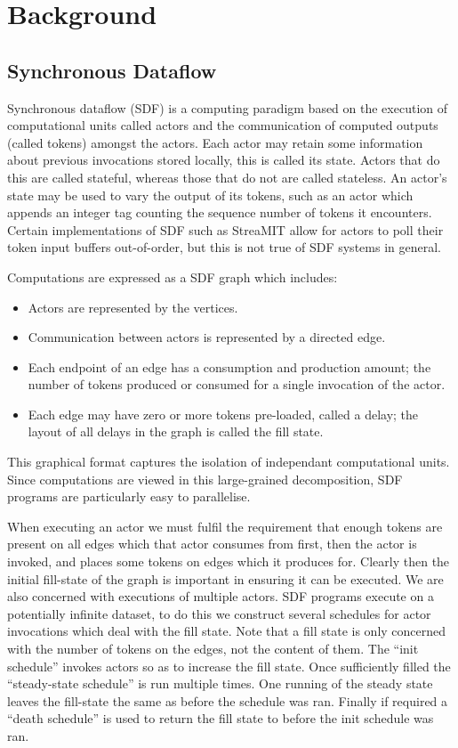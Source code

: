 \section{Background}
\subsection{Synchronous Dataflow}
Synchronous dataflow (SDF) is a computing paradigm based on the execution of computational units called actors and the communication of computed outputs (called tokens) amongst the actors.
Each actor may retain some information about previous invocations stored locally, this is called its state.
Actors that do this are called stateful, whereas those that do not are called stateless.
An actor's state may be used to vary the output of its tokens, such as an actor which appends an integer tag counting the sequence number of tokens it encounters.
Certain implementations of SDF such as StreaMIT \cite{thies02} allow for actors to poll their token input buffers out-of-order, but this is not true of SDF systems in general.

Computations are expressed as a SDF graph which includes:
\begin{itemize}
	\item Actors are represented by the vertices.
	\item Communication between actors is represented by a directed edge.
	\item Each endpoint of an edge has a consumption and production amount; the number of tokens produced or consumed for a single invocation of the actor.
	\item Each edge may have zero or more tokens pre-loaded, called a delay; the layout of all delays in the graph is called the fill state.
\end{itemize}
This graphical format captures the isolation of independant computational units.
Since computations are viewed in this large-grained decomposition, SDF programs are particularly easy to parallelise.

When executing an actor we must fulfil the requirement that enough tokens are present on all edges which that actor consumes from first, then the actor is invoked, and places some tokens on edges which it produces for.
Clearly then the initial fill-state of the graph is important in ensuring it can be executed.
We are also concerned with executions of multiple actors.
SDF programs execute on a potentially infinite dataset, to do this we construct several schedules for actor invocations which deal with the fill state.
Note that a fill state is only concerned with the number of tokens on the edges, not the content of them.
The ``init schedule'' invokes actors so as to increase the fill state.
Once sufficiently filled the ``steady-state schedule'' is run multiple times.
One running of the steady state leaves the fill-state the same as before the schedule was ran.
Finally if required a ``death schedule'' is used to return the fill state to before the init schedule was ran.

